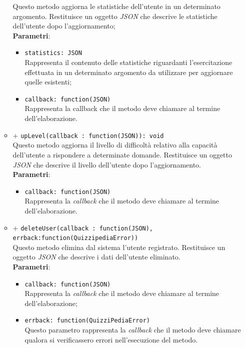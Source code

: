\begin{itemize}
\begin{itemize}
		Questo metodo aggiorna le statistiche dell'utente in un determinato argomento. Restituisce un oggetto \textit{JSON} che descrive le statistiche dell'utente dopo l'aggiornamento;	\\	
		\textbf{Parametri}: 
			\begin{itemize}
			\item
				\texttt{statistics: JSON} \\
				Rappresenta il contenuto delle statistiche riguardanti l'esercitazione effettuata in un determinato argomento da utilizzare per aggiornare quelle esistenti;
			\item	
				\texttt{callback: function(JSON)} \\
				Rappresenta la callback che il metodo deve chiamare al termine dell'elaborazione.
			\end{itemize}
		\item		
		+ \texttt{upLevel(callback : function(JSON)): void} \\
		Questo metodo aggiorna il livello di difficoltà relativo alla capacità dell'utente a rispondere a determinate domande. Restituisce un oggetto \textit{JSON} che descrive il livello dell'utente dopo l'aggiornamento.	\\	
		\textbf{Parametri}: 
			\begin{itemize}
			\item	
				\texttt{callback: function(JSON)} \\
				Rappresenta la \textit{callback} che il metodo deve chiamare al termine dell'elaborazione.		
			\end{itemize}
		\item		
		+ \texttt{deleteUser(callback : function(JSON), errback:function(QuizzipediaError))} \\	
		Questo metodo elimina dal sistema l'utente registrato. Restituisce un oggetto \textit{JSON} che descrive i dati dell'utente eliminato.	\\	
		\textbf{Parametri}: 
			\begin{itemize}
			\item	
				\texttt{callback: function(JSON)} \\
				Rappresenta la \textit{callback} che il metodo deve chiamare al termine dell'elaborazione;	
			\item	
				\texttt{errback: function(QuizziPediaError)} \\
				Questo parametro rappresenta la \textit{callback} che il metodo deve chiamare qualora si verificassero errori nell'esecuzione del metodo.		

\end{itemize}
\end{itemize}
\end{itemize}

